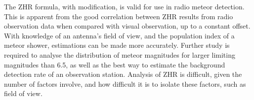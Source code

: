 The ZHR formula, with modification, is valid for use in radio meteor detection.
This is apparent from the good correlation between ZHR results from radio
observation data when compared with visual observation, up to a constant
offset. With knowledge of an antenna's field of view, and the population index
of a meteor shower, estimations can be made more accurately. Further study is
required to analyse the distribution of meteor magnitudes for larger limiting
magnitudes than 6.5, as well as the best way to estimate the background
detection rate of an observation station. Analysis of ZHR is difficult, given
the number of factors involve, and how difficult it is to isolate these
factors, such as field of view.
